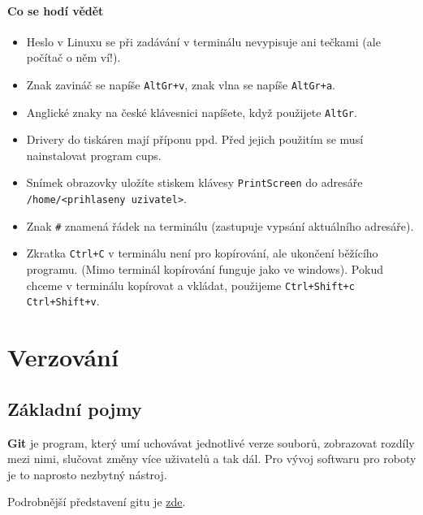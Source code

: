 \paragraph{Co se hodí vědět }

\begin{itemize}
	
	
\item Heslo v Linuxu se při zadávání v terminálu nevypisuje ani tečkami (ale počítač o něm ví!). 

\item Znak zavináč se napíše {\tt AltGr+v}, znak vlna se napíše {\tt AltGr+a}.

\item Anglické znaky na české klávesnici napíšete, když použijete {\tt AltGr}. 

\item Drivery do tiskáren mají příponu ppd. Před jejich použitím se musí nainstalovat program cups. 

\item Snímek obrazovky uložíte stiskem klávesy {\tt PrintScreen} do adresáře 
{\tt /home/<prihlaseny uzivatel>}. 

\item Znak {\tt \#} znamená řádek na terminálu (zastupuje vypsání aktuálního adresáře). 

\item Zkratka {\tt Ctrl+C} v terminálu není pro kopírování, ale ukončení běžícího programu. (Mimo terminál kopírování funguje jako ve windows). Pokud chceme v terminálu kopírovat a vkládat, použijeme {\tt Ctrl+Shift+c}  {\tt Ctrl+Shift+v}.

	
\end{itemize}


\section{Verzování} 


\subsection{Základní pojmy}


{\bf Git} je program, který umí uchovávat jednotlivé verze souborů, zobrazovat rozdíly mezi nimi, slučovat změny více uživatelů a tak dál. Pro vývoj softwaru pro roboty je to naprosto nezbytný nástroj. 

Podrobnější představení gitu je  \href{http://www.kutac.cz/blog/pocitace-a-internety/jak-na-git-dil-0-co-proc-jak/}{zde}.

